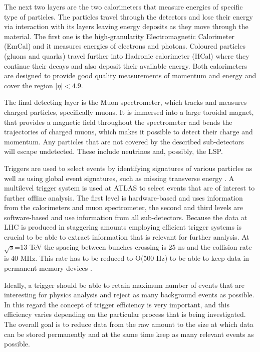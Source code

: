 The next two layers are the two calorimeters that measure energies of specific type of particles. The particles travel through the detectors and lose their energy via interaction with its layers leaving energy deposits as they move through the material. 
The first one is the high-granularity Electromagnetic Calorimeter (EmCal) and it measures energies of electrons and photons. Coloured particles (gluons and quarks) travel further into Hadronic calorimeter (HCal) where they continue their decays and also deposit their available energy. 
Both calorimeters are  designed to provide good quality measurements of momentum and energy and cover the region $|\eta|<4.9$.

The final detecting layer is the Muon spectrometer, which tracks and measures charged particles, specifically muons. It is immersed into a large toroidal magnet, that provides a magnetic field throughout the spectrometer and bends the trajectories of charged muons, which makes it possible to detect their charge and momentum. Any particles that are not covered by the described sub-detectors will escape undetected. These include neutrinos and, possibly, the LSP. 

Triggers are used to select events by identifying signatures of various particles as well as using global event signatures, such as missing transverse energy \citep{aad2012performance}. A multilevel trigger system is used at ATLAS to select events that are of interest to further offline analysis. 
The  first  level is hardware-based and uses information from the calorimeters and muon spectrometer, the second and third levels are software-based and use information from all sub-detectors. Because the data at LHC is produced in staggering amounts employing efficient trigger systems is crucial to be able to extract information that is relevant for further analysis. At $\sqrt{s}$=13 TeV the spacing between bunches crossing is 25 ns and the collision rate is 40 MHz. This rate has to be reduced to O(500 Hz) to be able to keep data in permanent memory devices \citep{barr2015particle}.

Ideally, a trigger should be able to retain maximum number of events that are interesting for physics analysis and reject as many background events as possible. In this regard the concept of trigger efficiency is very important, and this efficiency varies depending on the particular process that is being investigated. The overall goal is to reduce data from the raw amount to the size at which data can be stored permanently and at the same time keep as many relevant events as possible. 
